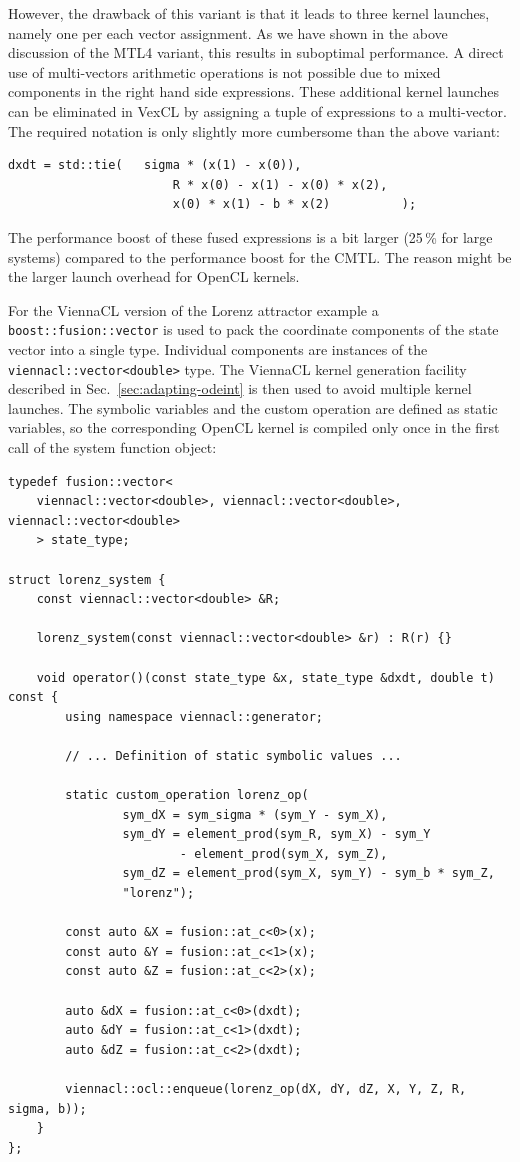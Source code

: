 \documentclass[final]{siamltex}
\newcommand{\code}[1]{\lstinline|#1|}
\begin{document}
However, the drawback of this variant is that it leads to three kernel
launches, namely one per each vector assignment. As we have shown in
the above discussion of the MTL4 variant, this results in suboptimal
performance. A direct use of multi-vectors arithmetic operations is
not possible due to mixed components in the right hand side
expressions.  These additional kernel launches can be eliminated in
VexCL by assigning a tuple of expressions to a multi-vector. The
required notation is only slightly more cumbersome than the above
variant:
\begin{lstlisting}[firstnumber=9]
    dxdt = std::tie(   sigma * (x(1) - x(0)),
                       R * x(0) - x(1) - x(0) * x(2),
                       x(0) * x(1) - b * x(2)          );
\end{lstlisting}
The performance boost of these fused expressions is a bit larger
(25\,\% for large systems) compared to the performance boost for the
CMTL. The reason might be the larger launch overhead for OpenCL
kernels.

For the ViennaCL version of the Lorenz attractor example a
\code{boost::fusion::vector} is used to pack the coordinate components of the
state vector into a single type. Individual components are instances of the
\code{viennacl::vector<double>} type.  The ViennaCL kernel generation facility described in
Sec.~\ref{sec:adapting-odeint} is then used to avoid multiple kernel launches.
The symbolic variables and the custom operation
are defined as static variables, so the corresponding OpenCL kernel is compiled
only once in the first call of the system function object:
\begin{lstlisting}
typedef fusion::vector<
    viennacl::vector<double>, viennacl::vector<double>, viennacl::vector<double>
    > state_type;

struct lorenz_system {
    const viennacl::vector<double> &R;

    lorenz_system(const viennacl::vector<double> &r) : R(r) {}

    void operator()(const state_type &x, state_type &dxdt, double t) const {
        using namespace viennacl::generator;

        // ... Definition of static symbolic values ...

        static custom_operation lorenz_op(
                sym_dX = sym_sigma * (sym_Y - sym_X),
                sym_dY = element_prod(sym_R, sym_X) - sym_Y
                        - element_prod(sym_X, sym_Z),
                sym_dZ = element_prod(sym_X, sym_Y) - sym_b * sym_Z,
                "lorenz");

        const auto &X = fusion::at_c<0>(x);
        const auto &Y = fusion::at_c<1>(x);
        const auto &Z = fusion::at_c<2>(x);

        auto &dX = fusion::at_c<0>(dxdt);
        auto &dY = fusion::at_c<1>(dxdt);
        auto &dZ = fusion::at_c<2>(dxdt);

        viennacl::ocl::enqueue(lorenz_op(dX, dY, dZ, X, Y, Z, R, sigma, b));
    }
};
\end{lstlisting}
\end{document}
